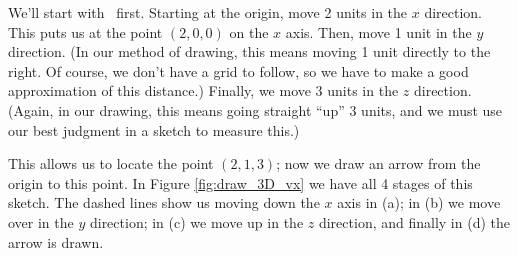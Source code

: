 {We'll start with \vv\ first. Starting at the origin, move 2 units in the $x$ direction. This puts us at the point $(2,0,0)$ on the $x$ axis. Then, move 1 unit in the $y$ direction. (In our method of drawing, this means moving 1 unit directly to the right. Of course, we don't have a grid to follow, so we have to make a good approximation of this distance.) Finally, we move 3 units in the $z$ direction. (Again, in our drawing, this means going straight ``up'' 3 units, and we must use our best judgment in a sketch to measure this.)

This allows us to locate the point $(2,1,3)$; now we draw an arrow from the origin to this point. In Figure \ref{fig:draw_3D_vx} we have all 4 stages of this sketch. The dashed lines show us moving down the $x$ axis in (a); in (b) we move over in the $y$ direction; in (c) we move up in the $z$ direction, and finally in (d) the arrow is drawn.

\begin{figure}[h!]
\begin{center}
\end{center}
\end{figure}}
